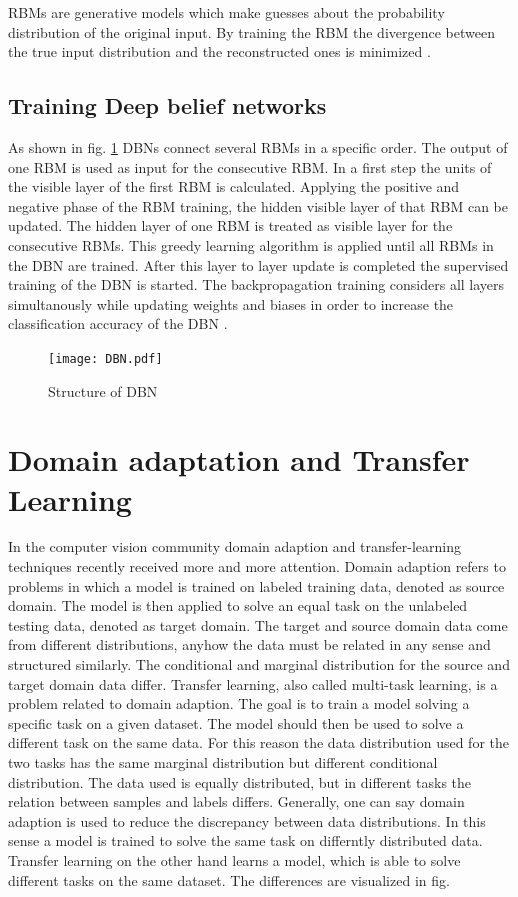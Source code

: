RBMs are generative models which make guesses about the probability distribution of the original input. By training the RBM the divergence between the true input distribution and the reconstructed ones is minimized \cite{Hinton2010}.

\subsection{Training Deep belief networks}
As shown in fig. \ref{fig:DBN} DBNs connect several RBMs in a specific order. The output of one RBM is used as input for the consecutive RBM. In a first step the units of the visible layer of the first RBM is calculated. Applying the positive and negative phase of the RBM training, the hidden visible layer of that RBM can be updated. The hidden layer of one RBM is treated as visible layer for the consecutive RBMs. This greedy learning algorithm is applied until all RBMs in the DBN are trained. After this layer to layer update is completed the supervised training of the DBN is started. The backpropagation training considers all layers simultanously while updating weights and biases in order to increase the classification accuracy of the DBN \cite{Zhang2017}.

\begin{figure}[H]
  \centering
  \texttt{[image: DBN.pdf]}
  \caption {Structure of DBN \cite{Zhang2017}} \label{fig:DBN}
\end{figure}


\section{Domain adaptation and Transfer Learning}

In the computer vision community domain adaption and transfer-learning techniques recently received more and more attention. Domain adaption refers to problems in which a model is trained on labeled training data, denoted as source domain. The model is then applied to solve an equal task on the unlabeled testing data, denoted as target domain. The target and source domain data come from different distributions, anyhow the data must be related in any sense and structured similarly. The conditional and marginal distribution for the source and target domain data differ. Transfer learning, also called multi-task learning, is a problem related to domain adaption. The goal is to train a model solving a specific task on a given dataset. The model should then be used to solve a different task on the same data. For this reason the data distribution used for the two tasks has the same marginal distribution but different conditional distribution. The data used is equally distributed, but in different tasks the relation between samples and labels differs. Generally, one can say domain adaption is used to reduce the discrepancy between data distributions. In this sense a model is trained to solve the same task on differntly distributed data. Transfer learning on the other hand learns a model, which is able to solve different tasks on the same dataset. The differences are visualized in fig. \label{fig:domain_adaption_vs_transfer_learning}

